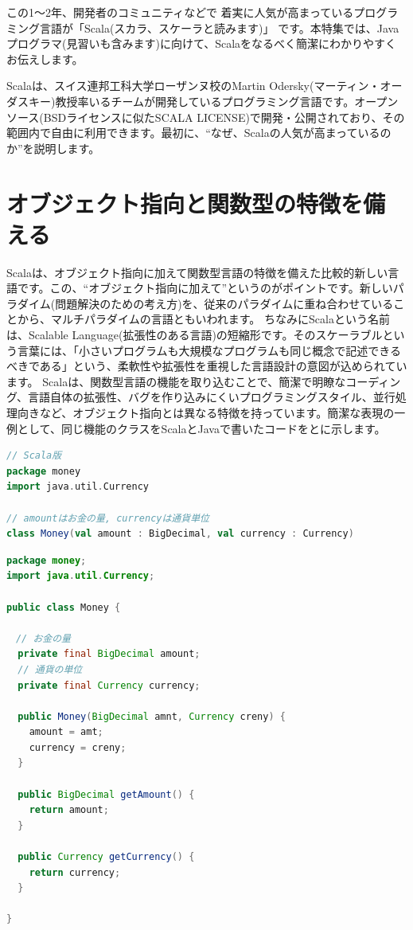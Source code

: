 \begin{screen}
この1〜2年、開発者のコミュニティなどで 着実に人気が高まっているプログラミング言語が「Scala(スカラ、スケーラと読みます)」 です。本特集では、Javaプログラマ(見習いも含みます)に向けて、Scalaをなるべく簡潔にわかりやすくお伝えします。  
\end{screen}

Scalaは、スイス連邦工科大学ローザンヌ校のMartin Odersky(マーティン・オーダスキー)教授率いるチームが開発しているプログラミング言語です。オープンソース(BSDライセンスに似たSCALA LICENSE)で開発・公開されており、その範囲内で自由に利用できます。最初に、“なぜ、Scalaの人気が高まっているのか”を説明します。

\section*{オブジェクト指向と関数型の特徴を備える} 
Scalaは、オブジェクト指向に加えて関数型言語の特徴を備えた比較的新しい言語です。この、“オブジェクト指向に加えて”というのがポイントです。新しいパラダイム(問題解決のための考え方)を、従来のパラダイムに重ね合わせていることから、マルチパラダイムの言語ともいわれます。 ちなみにScalaという名前は、Scalable Language(拡張性のある言語)の短縮形です。そのスケーラブルという言葉には、「小さいプログラムも大規模なプログラムも同じ概念で記述できるべきである」という、柔軟性や拡張性を重視した言語設計の意図が込められています。 Scalaは、関数型言語の機能を取り込むことで、簡潔で明瞭なコーディング、言語自体の拡張性、バグを作り込みにくいプログラミングスタイル、並行処理向きなど、オブジェクト指向とは異なる特徴を持っています。簡潔な表現の一例として、同じ機能のクラスをScalaとJavaで書いたコードをとに示します。 

\begin{lstlisting}[language=scala, label=src:money_scala, caption=お金を表すクラスのScala版]
// Scala版
package money
import java.util.Currency

// amountはお金の量, currencyは通貨単位    
class Money(val amount : BigDecimal, val currency : Currency)    
\end{lstlisting}
 
\begin{lstlisting}[language=java, label=src:money_java, caption=お金を表すクラスのJava版]
package money;
import java.util.Currency;

public class Money {

　// お金の量
  private final BigDecimal amount;
  // 通貨の単位
  private final Currency currency;

  public Money(BigDecimal amnt, Currency creny) {
    amount = amt;
    currency = creny;
  }

  public BigDecimal getAmount() {
    return amount;
  }

  public Currency getCurrency() {
    return currency;
  }

}
\end{lstlisting}

